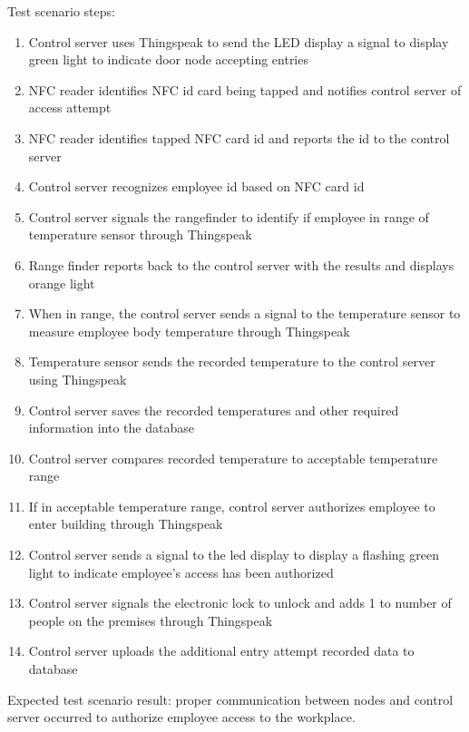 \noindent
Test scenario steps:
\begin{enumerate}
    \item Control server uses Thingspeak to send the LED display a signal to
          display green light to indicate door node accepting entries
    \item NFC reader identifies NFC id card being tapped and notifies control
          server of access attempt
    \item NFC reader identifies tapped NFC card id and reports the id to the
          control server
    \item Control server recognizes employee id based on NFC card id
    \item Control server signals the rangefinder to identify if employee in
          range of temperature sensor through Thingspeak
    \item Range finder reports back to the control server with the results and
          displays orange light
    \item When in range, the control server sends a signal to the temperature
          sensor to measure employee body temperature through Thingspeak
    \item Temperature sensor sends the recorded temperature to the control
          server using Thingspeak
    \item Control server saves the recorded temperatures and other required
          information into the database
    \item Control server compares recorded temperature to acceptable temperature
          range
    \item If in acceptable temperature range, control server authorizes employee
          to enter building through Thingspeak
    \item Control server sends a signal to the led display to display a flashing
          green light to indicate employee's access has been authorized
    \item Control server signals the electronic lock to unlock and adds 1 to
          number of people on the premises through Thingspeak
    \item Control server uploads the additional entry attempt recorded data to
          database
\end{enumerate}

\noindent
Expected test scenario result: proper communication between nodes and control
server occurred to authorize employee access to the workplace.


